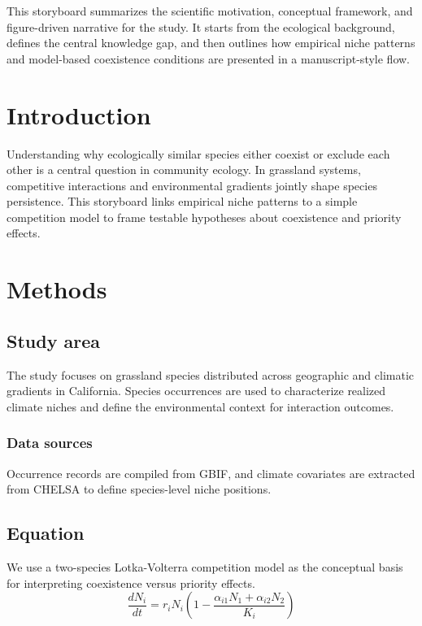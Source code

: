 \documentclass[12pt]{article}
\begin{document}
\title{}
\author{}
\date{}
\maketitle

This storyboard summarizes the scientific motivation, conceptual framework, and figure-driven narrative for the study. It starts from the ecological background, defines the central knowledge gap, and then outlines how empirical niche patterns and model-based coexistence conditions are presented in a manuscript-style flow.

\section{Introduction}
Understanding why ecologically similar species either coexist or exclude each other is a central question in community ecology. In grassland systems, competitive interactions and environmental gradients jointly shape species persistence. This storyboard links empirical niche patterns to a simple competition model to frame testable hypotheses about coexistence and priority effects.

\section{Methods}

\subsection{Study area}
The study focuses on grassland species distributed across geographic and climatic gradients in California. Species occurrences are used to characterize realized climate niches and define the environmental context for interaction outcomes.

\subsubsection{Data sources}
Occurrence records are compiled from GBIF, and climate covariates are extracted from CHELSA to define species-level niche positions.

\subsection{Equation}
We use a two-species Lotka-Volterra competition model as the conceptual basis for interpreting coexistence versus priority effects.
\begin{equation}
\frac{dN_i}{dt} = r_i N_i \left(1 - \frac{\alpha_{i1}N_1 + \alpha_{i2}N_2}{K_i}\right)
\label{equ:LV}
\end{equation}
\end{document}
